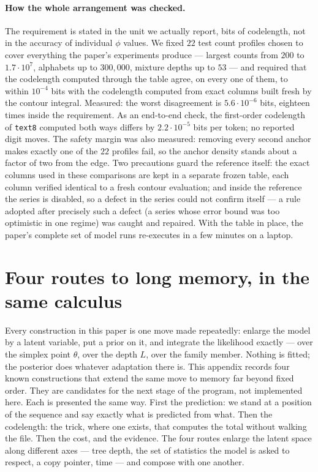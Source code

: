 \documentclass[11pt]{article}
\begin{document}
\paragraph{How the whole arrangement was checked.}
The requirement is stated in the unit we actually report, bits of
codelength, not in the accuracy of individual $\phi$ values.  We
fixed $22$ test count profiles chosen to cover everything the
paper's experiments produce --- largest counts from $200$ to
$1.7 \cdot 10^7$, alphabets up to $300{,}000$, mixture depths up to
$53$ --- and required that the codelength computed through the table
agree, on every one of them, to within $10^{-4}$ bits with the
codelength computed from exact columns built fresh by the contour
integral.  Measured: the worst disagreement is $5.6 \cdot 10^{-6}$
bits, eighteen times inside the requirement.  As an end-to-end check,
the first-order codelength of \texttt{text8} computed both ways
differs by $2.2 \cdot 10^{-5}$ bits per token; no reported digit
moves.  The safety margin was also measured: removing every second
anchor makes exactly one of the $22$ profiles fail, so the anchor
density stands about a factor of two from the edge.  Two precautions
guard the reference itself: the exact columns used in these
comparisons are kept in a separate frozen table, each column verified
identical to a fresh contour evaluation; and inside the reference the
series is disabled, so a defect in the series could not confirm
itself --- a rule adopted after precisely such a defect (a series
whose error bound was too optimistic in one regime) was caught and
repaired.  With the table in place, the paper's complete set of model
runs re-executes in a few minutes on a laptop.

\section{Four routes to long memory, in the same calculus}
\label{app:routes}

Every construction in this paper is one move made repeatedly: enlarge
the model by a latent variable, put a prior on it, and integrate the
likelihood exactly --- over the simplex point $\theta$, over the depth
$L$, over the family member.  Nothing is fitted; the posterior does
whatever adaptation there is.  This appendix records four known
constructions that extend the same move to memory far beyond fixed
order.  They are candidates for the next stage of the program, not
implemented here.  Each is presented the same way.  First the
prediction: we stand at a position of the sequence and say exactly
what is predicted from what.  Then the codelength: the trick, where
one exists, that computes the total without walking the file.  Then
the cost, and the evidence.  The four routes enlarge the latent
space along different axes --- tree depth, the set of statistics the
model is asked to respect, a copy pointer, time --- and compose with
one another.
\end{document}

